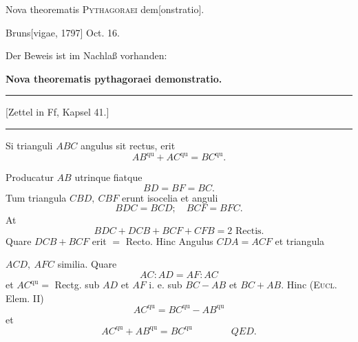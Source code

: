 \clearpage{}
\indent Nova theorematis \textsc{Pythagoraei} dem[onstratio].
\par\noindent\hfill Bruns[vigae, 1797] Oct. 16.

\medskip\begingroup\small
\indent Der Beweis ist im Nachlaß vorhanden:
\par\endgroup
\begin{center}
\textbf{Nova theorematis pythagoraei demonstratio.}\par\medskip
\rule{.31\linewidth}{.35pt}\par
{\small[Zettel in Ff, Kapsel 41.]}\par
\rule{.31\linewidth}{.35pt}
\end{center}
\begin{center}
\end{center}
\begin{center}\end{center}
\indent Si trianguli \(ABC\) angulus sit rectus, erit
\[
AB^{\mathrm{qu}}+AC^{\mathrm{qu}}=BC^{\mathrm{qu}}.
\]
\noindent{}
\par\indent Producatur \(AB\) utrinque fiatque
\[
BD=BF=BC.
\]
\noindent Tum triangula \(CBD,\ CBF\) erunt isocelia et anguli
\[
BDC=BCD;\quad BCF=BFC.
\]
\noindent At
\[
BDC+DCB+BCF+CFB=2\text{ Rectis.}
\]
\noindent Quare \(DCB+BCF\) erit \(=\) Recto. Hinc Angulus \(CDA=ACF\) et triangula

\clearpage{}
\noindent\(ACD,\ AFC\) similia. Quare
\[
AC:AD=AF:AC
\]
\noindent et \(AC^{\mathrm{qu}}=\) Rectg. sub \(AD\) et \(AF\) i. e. sub \(BC-AB\) et \(BC+AB\). Hinc (\textsc{Eucl.} Elem. II)
\[
AC^{\mathrm{qu}}=BC^{\mathrm{qu}}-AB^{\mathrm{qu}}
\]
\noindent et
\[
AC^{\mathrm{qu}}+AB^{\mathrm{qu}}=BC^{\mathrm{qu}}\qquad\qquad QED.
\]

